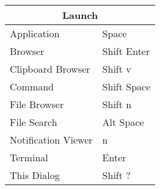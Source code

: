 \documentclass[12pt,paper=landscape,paper=a4]{scrartcl}
\begin{document}
\pagestyle{empty}
\pagecolor{gruvbox_bg} %
\color{gruvbox_fg}

\begin{multicols}{2}

    \begin{tabular}{ll}
         \multicolumn{2}{c}{Launch} \\
         \hline
         Application         & \faWindows{} Space\\
         Browser             & \faWindows{} Shift Enter\\
         Clipboard Browser   & \faWindows{} Shift v\\
         Command             & \faWindows{} Shift Space\\
         File Browser        & \faWindows{} Shift n\\
         File Search         & \faWindows{} Alt Space\\
         Notification Viewer & \faWindows{} n\\
         Terminal            & \faWindows{} Enter\\
         This Dialog         & \faWindows{} Shift ?
    \end{tabular}

    \vspace{1em}


\end{multicols}
\end{document}

